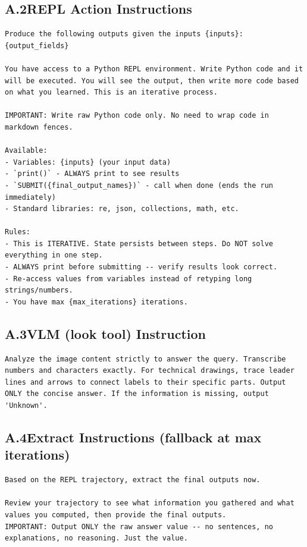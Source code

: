 \documentclass[10pt,twocolumn]{article}
\begin{document}
\subsection*{A.2\quad REPL Action Instructions}
\begin{lstlisting}
Produce the following outputs given the inputs {inputs}:
{output_fields}

You have access to a Python REPL environment. Write Python code and it will be executed. You will see the output, then write more code based on what you learned. This is an iterative process.

IMPORTANT: Write raw Python code only. No need to wrap code in markdown fences.

Available:
- Variables: {inputs} (your input data)
- `print()` - ALWAYS print to see results
- `SUBMIT({final_output_names})` - call when done (ends the run immediately)
- Standard libraries: re, json, collections, math, etc.

Rules:
- This is ITERATIVE. State persists between steps. Do NOT solve everything in one step.
- ALWAYS print before submitting -- verify results look correct.
- Re-access values from variables instead of retyping long strings/numbers.
- You have max {max_iterations} iterations.
\end{lstlisting}

\subsection*{A.3\quad VLM (look tool) Instruction}
\begin{lstlisting}
Analyze the image content strictly to answer the query. Transcribe numbers and characters exactly. For technical drawings, trace leader lines and arrows to connect labels to their specific parts. Output ONLY the concise answer. If the information is missing, output 'Unknown'.
\end{lstlisting}

\subsection*{A.4\quad Extract Instructions (fallback at max iterations)}
\begin{lstlisting}
Based on the REPL trajectory, extract the final outputs now.

Review your trajectory to see what information you gathered and what values you computed, then provide the final outputs.
IMPORTANT: Output ONLY the raw answer value -- no sentences, no explanations, no reasoning. Just the value.
\end{lstlisting}
\end{document}
